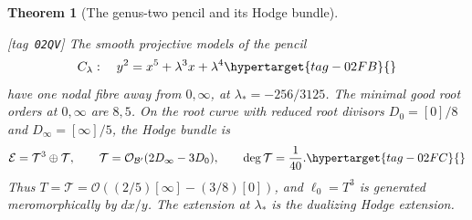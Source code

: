 \documentclass[11pt,a4paper]{article}
\numberwithin{equation}{section}
\newtheorem{theorem}{Theorem}[section]
\theoremstyle{definition}
\newcommand{\StatementRecord}[4]{{\upshape\footnotesize[tag~\texttt{#3}]}\enspace\ignorespaces}
\begin{document}
\begin{theorem}[The genus-two pencil and its Hodge bundle]\hypertarget{tag-02QV}{}\label{night:P1.4}
\StatementRecord{night:P1.4}{proved}{02QV}{the definitions and constructions stated in the proof}
The smooth projective models of the pencil
\begin{equation}
 C_\lambda:\quad y^2=x^5+\lambda^3x+\lambda^4
 \hypertarget{tag-02FB}{}\label{maps:eq:F.7}
\end{equation}
have one nodal fibre away from $0,\infty$, at $\lambda_*=-256/3125$.
The minimal good root orders at $0,\infty$ are $8,5$.
On the root curve with reduced root divisors $D_0=[0]/8$ and $D_\infty=[\infty]/5$, the Hodge bundle is
\begin{equation}
 \mathcal E=\mathcal T^3\oplus\mathcal T,\qquad
 \mathcal T=\mathcal O_{\mathcal B'}(2D_\infty-3D_0),\qquad
 \deg\mathcal T=\frac1{40}.
 \hypertarget{tag-02FC}{}\label{maps:eq:F.8}
\end{equation}
Thus $T=\mathcal T=\mathcal O((2/5)[\infty]-(3/8)[0])$, and $\ell_0=T^3$ is generated meromorphically by $dx/y$.
The extension at $\lambda_*$ is the dualizing Hodge extension.
\end{theorem}
\end{document}
